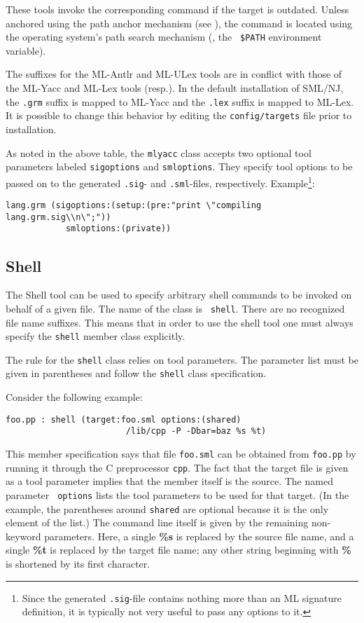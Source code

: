 These tools invoke the corresponding command if the target is outdated.
Unless anchored using the path anchor mechanism (see
), the command is located
using the operating system's path search mechanism (\eg{}, the {\tt
\$PATH} environment variable).

The suffixes for the ML-Antlr and ML-ULex tools are in conflict with those of the
ML-Yacc and ML-Lex tools (resp.).  In the default installation of SML/NJ, the \texttt{.grm}
suffix is mapped to ML-Yacc and the \texttt{.lex} suffix is mapped to ML-Lex.
It is possible to change this behavior by editing the \texttt{config/targets} file
prior to installation.

As noted in the above table, the {\tt mlyacc} class accepts two optional
tool parameters labeled {\tt sigoptions}
and {\tt smloptions}.  They specify tool options to be passed on to
the generated {\tt .sig}- and {\tt .sml}-files, respectively.
Example\footnote{Since the generated {\tt .sig}-file contains nothing
more than an ML signature definition, it is typically not very useful
to pass any options to it.}:

\begin{lstlisting}[language=CM]
  lang.grm (sigoptions:(setup:(pre:"print \"compiling lang.grm.sig\\n\";"))
            smloptions:(private))
\end{lstlisting}%

\subsection{Shell}

The Shell tool can be used to specify arbitrary shell commands to be
invoked on behalf of a given file.  The name of the class is {\tt
shell}.  There are no recognized file name suffixes.  This means that
in order to use the shell tool one must always specify the {\tt shell}
member class explicitly.

The rule for the {\tt shell} class relies on tool parameters.  The
parameter list must be given in parentheses and follow the {\tt shell}
class specification.

Consider the following example:

\begin{lstlisting}[language=CM]
  foo.pp : shell (target:foo.sml options:(shared)
                        /lib/cpp -P -Dbar=baz %s %t)
\end{lstlisting}%

This member specification says that file {\tt foo.sml} can be obtained
from {\tt foo.pp} by running it through the C preprocessor {\tt cpp}.
The fact that the target file is given as a tool parameter implies
that the member itself is the source.  The named parameter {\tt
options} lists the tool parameters to be used for that target. (In the
example, the parentheses around {\tt shared} are optional because it
is the only element of the list.) The command line itself is given by
the remaining non-keyword parameters.  Here, a single {\bf \%s} is
replaced by the source file name, and a single {\bf \%t} is replaced
by the target file name; any other string beginning with {\bf \%} is
shortened by its first character.

